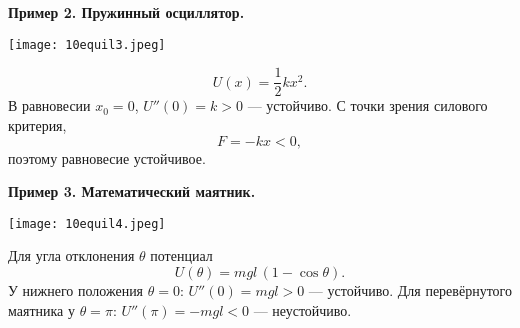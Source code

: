\documentclass[12pt, a4paper]{article}%
\begin{document}
\textbf{Пример 2. Пружинный осциллятор.}

\begin{center}
\texttt{[image: 10equil3.jpeg]}
\label{fig:mpr}
\end{center}

\[U(x)=\frac12 kx^2.\] В равновесии $x_0=0$, $U''(0)=k>0$ — устойчиво. С точки зрения силового критерия, 
\[
F = -kx < 0,
\]
поэтому равновесие устойчивое.

\textbf{Пример 3. Математический маятник.}

\begin{center}
\texttt{[image: 10equil4.jpeg]}
\label{fig:mpr}
\end{center}

Для угла отклонения $\theta$ потенциал \[U(\theta)=mgl\,(1-\cos\theta).\]
У нижнего положения $\theta=0$: $U''(0)=mgl>0$ — устойчиво.
Для перевёрнутого маятника у $\theta=\pi$: $U''(\pi)=-mgl<0$ — неустойчиво.
\end{document}
